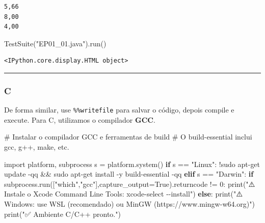 \documentclass[
  portuguese,
  letterpaper,
  openany,
  oneside,
  12pt,
  a4paper]{book}
\newenvironment{Shaded}{\begin{snugshade}}{\end{snugshade}}
\newcommand{\BuiltInTok}[1]{\textcolor[rgb]{0.00,0.23,0.31}{#1}}
\newcommand{\CommentTok}[1]{\textcolor[rgb]{0.37,0.37,0.37}{#1}}
\newcommand{\ControlFlowTok}[1]{\textcolor[rgb]{0.00,0.23,0.31}{\textbf{#1}}}
\newcommand{\DecValTok}[1]{\textcolor[rgb]{0.68,0.00,0.00}{#1}}
\newcommand{\ImportTok}[1]{\textcolor[rgb]{0.00,0.46,0.62}{#1}}
\newcommand{\NormalTok}[1]{\textcolor[rgb]{0.00,0.23,0.31}{#1}}
\newcommand{\OperatorTok}[1]{\textcolor[rgb]{0.37,0.37,0.37}{#1}}
\newcommand{\StringTok}[1]{\textcolor[rgb]{0.13,0.47,0.30}{#1}}
\newcommand{\VariableTok}[1]{\textcolor[rgb]{0.07,0.07,0.07}{#1}}
\begin{document}
\begin{verbatim}
5,66
8,00
4,00
\end{verbatim}

\begin{Shaded}
\begin{Highlighting}[]
\NormalTok{TestSuite(}\StringTok{"EP01\_01.java"}\NormalTok{).run()}
\end{Highlighting}
\end{Shaded}

\begin{verbatim}
<IPython.core.display.HTML object>
\end{verbatim}

\begin{center}\rule{0.5\linewidth}{0.5pt}\end{center}

\subsubsection{\texorpdfstring{ C}{ C}}\label{c}

De forma similar, use \texttt{\%\%writefile} para salvar o código,
depois compile e execute. Para C, utilizamos o compilador \textbf{GCC}.

\begin{Shaded}
\begin{Highlighting}[]
\CommentTok{\# Instalar o compilador GCC e ferramentas de build}
\CommentTok{\# O build{-}essential inclui gcc, g++, make, etc.}

\ImportTok{import}\NormalTok{ platform, subprocess}
\NormalTok{s }\OperatorTok{=}\NormalTok{ platform.system()}
\ControlFlowTok{if}\NormalTok{ s }\OperatorTok{==} \StringTok{"Linux"}\NormalTok{:}
    \OperatorTok{!}\NormalTok{sudo apt}\OperatorTok{{-}}\NormalTok{get update }\OperatorTok{{-}}\NormalTok{qq }\OperatorTok{\&\&}\NormalTok{ sudo apt}\OperatorTok{{-}}\NormalTok{get install }\OperatorTok{{-}}\NormalTok{y build}\OperatorTok{{-}}\NormalTok{essential }\OperatorTok{{-}}\NormalTok{qq}
\ControlFlowTok{elif}\NormalTok{ s }\OperatorTok{==} \StringTok{"Darwin"}\NormalTok{:}
    \ControlFlowTok{if}\NormalTok{ subprocess.run([}\StringTok{"which"}\NormalTok{,}\StringTok{"gcc"}\NormalTok{],capture\_output}\OperatorTok{=}\VariableTok{True}\NormalTok{).returncode }\OperatorTok{!=} \DecValTok{0}\NormalTok{:}
        \BuiltInTok{print}\NormalTok{(}\StringTok{"⚠️ Instale o Xcode Command Line Tools: xcode{-}select {-}{-}install"}\NormalTok{)}
\ControlFlowTok{else}\NormalTok{:}
    \BuiltInTok{print}\NormalTok{(}\StringTok{"⚠️ Windows: use WSL (recomendado) ou MinGW (https://www.mingw{-}w64.org)"}\NormalTok{)}
\BuiltInTok{print}\NormalTok{(}\StringTok{"✅ Ambiente C/C++ pronto."}\NormalTok{)}
\end{Highlighting}
\end{Shaded}
\end{document}
